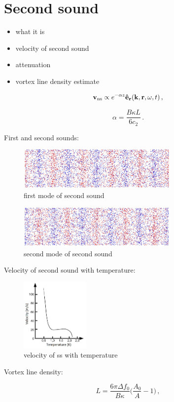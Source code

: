 \section{Second sound}
\begin{itemize}
	\item what it is
	\item velocity of second sound
	\item attenuation
	\item vortex line density estimate
\end{itemize}

\begin{equation}
\mathbf{v}_{\mathrm{ns}} \propto e^{-\alpha z} \mathbf{\hat{e}}_{\mathbf{r}}(\mathbf{k},\mathbf{r},\omega,t)\,,
\end{equation}

\begin{equation}
\alpha = \frac{B\kappa L}{6 c_2}
\label{alpha_mean}\,.
\end{equation}


First and second sounds:

\begin{figure}[h]
	\centering
	\includegraphics[width=0.7\textwidth]{graphics/theory/ss_1}
	\caption{first mode of second sound}
	\label{ss_1}
\end{figure}

\begin{figure}[h]
	\centering
	\includegraphics[width=0.7\textwidth]{graphics/theory/ss_2}
	\caption{second mode of second sound}
	\label{ss_2}
\end{figure}

Velocity of second sound with temperature:

\begin{figure}[h]
	\centering
	\includegraphics[width=0.3\textwidth]{graphics/theory/ss_velocity}
	\caption{velocity of ss with temperature}
	\label{ss_velocity}
\end{figure}

Vortex line density:

\begin{equation}
L = \frac{6\pi \Delta f_0}{B\kappa}\bigg( \frac{A_0}{A} - 1 \bigg)\,,
\label{L}
\end{equation}


\newpage
